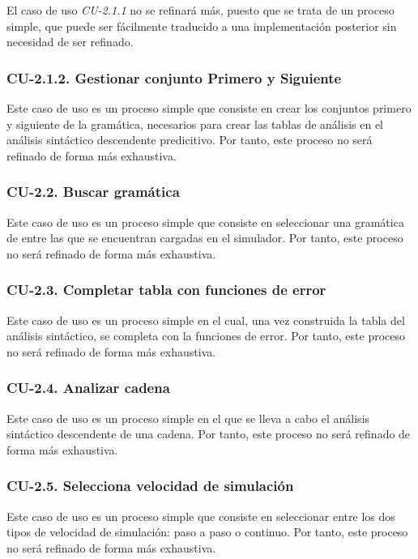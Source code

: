  El caso de uso \textit{CU-2.1.1} no se refinará más, puesto que se trata de un proceso simple, que puede ser fácilmente traducido a una implementación posterior sin necesidad de ser refinado.


\subsubsection{CU-2.1.2. Gestionar conjunto Primero y Siguiente}

Este caso de uso es un proceso simple que consiste en crear los conjuntos primero y siguiente de la gramática, necesarios para crear las tablas de análisis en el análisis sintáctico descendente predicitivo. Por tanto, este proceso no será refinado de forma más exhaustiva.

\subsubsection{CU-2.2. Buscar gramática}

Este caso de uso es un proceso simple que consiste en seleccionar una gramática de entre las que se encuentran cargadas en el simulador. Por tanto, este proceso no será refinado de forma más exhaustiva.


\subsubsection{CU-2.3. Completar tabla con funciones de error}

Este caso de uso es un proceso simple en el cual, una vez construida la tabla del análisis sintáctico, se completa con la funciones de error. Por tanto, este proceso no será refinado de forma más exhaustiva.

 \subsubsection{CU-2.4. Analizar cadena}

 Este caso de uso es un proceso simple en el que se lleva a cabo el análisis sintáctico descendente de una cadena. Por tanto, este proceso no será refinado de forma más exhaustiva.

 \subsubsection{CU-2.5. Selecciona velocidad de simulación}

 Este caso de uso es un proceso simple que consiste en seleccionar entre los dos tipos de velocidad de simulación: paso a paso o continuo. Por tanto, este proceso no será refinado de forma más exhaustiva.

